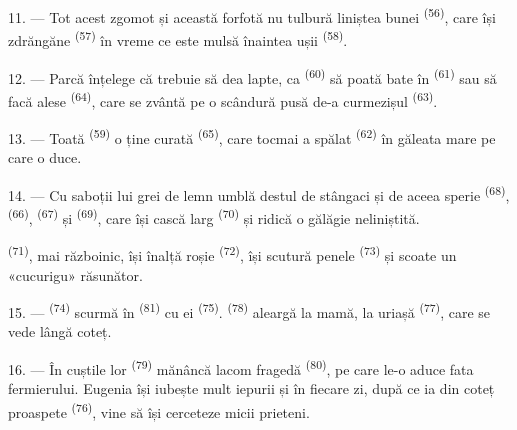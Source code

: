 11. --- Tot acest zgomot și această forfotă nu tulbură liniștea bunei  \textsuperscript{(56)}, care își zdrăngăne 
\textsuperscript{(57)} în vreme ce este mulsă înaintea ușii  \textsuperscript{(58)}.

12. --- Parcă înțelege că trebuie să dea lapte, ca 
\textsuperscript{(60)} să poată bate  în 
\textsuperscript{(61)} sau să facă  alese
\textsuperscript{(64)}, care se zvântă pe o scândură pusă de-a curmezișul
 \textsuperscript{(63)}.

13. --- Toată  \textsuperscript{(59)} o ține curată
 \textsuperscript{(65)}, care tocmai a spălat 
\textsuperscript{(62)} în găleata mare pe care o duce.

\VUsaut{3.0mm}
\VUsaut{3.0mm}

14. --- Cu saboții lui grei de lemn umblă destul de stângaci și de aceea sperie
 \textsuperscript{(68)}, 
\textsuperscript{(66)},  \textsuperscript{(67)} și
 \textsuperscript{(69)}, care își cască larg 
\textsuperscript{(70)} și ridică o gălăgie neliniștită.

 \textsuperscript{(71)}, mai războinic, își înalță 
roșie \textsuperscript{(72)}, își scutură penele 
\textsuperscript{(73)} și scoate un «cucurigu» răsunător.

15. ---  \textsuperscript{(74)} scurmă în  \textsuperscript{(81)} cu  ei \textsuperscript{(75)}.
 \textsuperscript{(78)} aleargă la mamă, la 
uriașă \textsuperscript{(77)}, care se vede lângă coteț.

16. --- În cuștile lor  \textsuperscript{(79)} mănâncă lacom
 fragedă \textsuperscript{(80)}, pe care le-o aduce fata fermierului.
Eugenia își iubește mult iepurii și în fiecare zi, după ce ia din coteț
 proaspete \textsuperscript{(76)}, vine să își cerceteze micii
prieteni.
\VUsaut{6.0mm}
\VUfilet{22mm}

